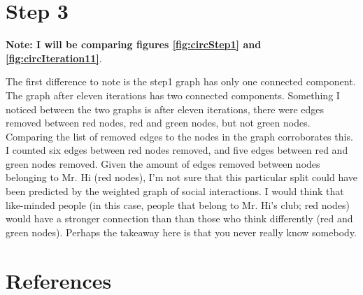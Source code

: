 \documentclass[12pt]{article}
\begin{document}






\section*{Step 3}
\textbf{Note: I will be comparing figures \ref{fig:circStep1} and \ref{fig:circIteration11}}.

The first difference to note is the step1 graph has only one connected component.  The graph after eleven iterations has two connected components.  Something I noticed between the two graphs is after eleven iterations, there were edges removed between red nodes, red and green nodes, but not green nodes.  Comparing the list of removed edges to the nodes in the graph corroborates this.  I counted six edges between red nodes removed, and five edges between red and green nodes removed.  Given the amount of edges removed between nodes belonging to Mr. Hi (red nodes), I'm not sure that this particular split could have been predicted by the weighted graph of social interactions.  I would think that like-minded people (in this case, people that belong to Mr. Hi's club; red nodes) would have a stronger connection than than those who think differently (red and green nodes).  Perhaps the takeaway here is that you never really know somebody.

\pagebreak

\section*{References}
\end{document}
